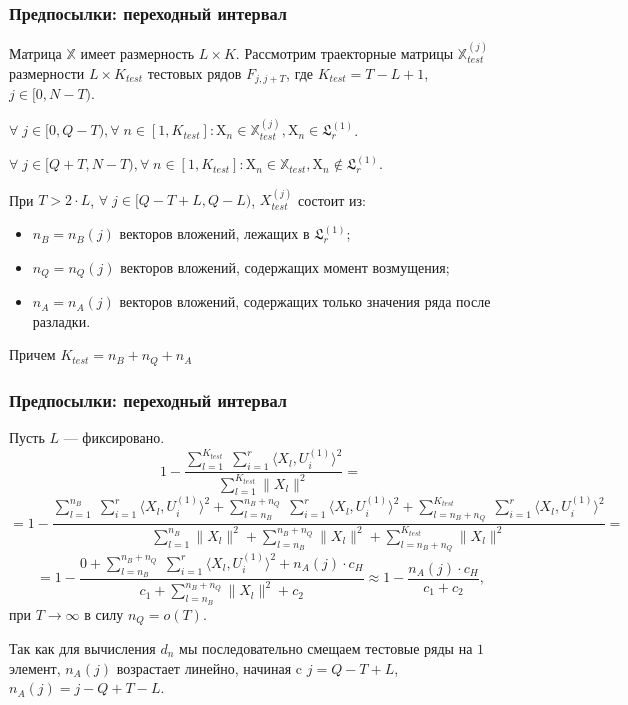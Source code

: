 \documentclass[11pt]{beamer}
\begin{document}
	\begin{frame}
		\frametitle{Предпосылки: переходный интервал}
		Матрица $ \mathbb{X} $ имеет размерность $ L \times K $. Рассмотрим траекторные матрицы $ \mathbb{X}_{test}^{(j)} $ размерности $ L \times K_{test} $ тестовых рядов $ F_{j, j+T} $, где $ K_{test} = T - L + 1 $, $ j \in [0, N-T) $. 
		
		$ \forall \; j \in [0, Q - T), \forall \; n \in [1, K_{test}]: \mathrm{X}_n \in \mathbb{X}_{test}^{(j)},  \mathrm{X}_n \in \mathfrak{L}_r^{(1)}$.
		
		$ \forall \; j \in [Q+T, N-T), \forall \; n \in [1, K_{test}]: \mathrm{X}_n \in \mathbb{X}_{test},  \mathrm{X}_n \notin \mathfrak{L}_r^{(1)} $. 
		
		\bigskip
		
		При $ T > 2 \cdot L $, $ \forall \; j \in [Q - T + L, Q - L)$, $ X_{test}^{(j)} $ состоит из:
		
		\begin{itemize}
			\item $ n_B = n_B(j) $ векторов вложений, лежащих в $ \mathfrak{L}_r^{(1)} $;
			\item $ n_Q = n_Q(j) $ векторов вложений, содержащих момент возмущения;
			\item $ n_A = n_A(j) $ векторов вложений, содержащих только значения ряда после разладки.
		\end{itemize}
		
		Причем $ K_{test} = n_B + n_Q + n_A $
		
	\end{frame}

	\begin{frame}
		\frametitle{Предпосылки: переходный интервал}
		Пусть $ L $ --- фиксировано. 
		\tiny
		$$ 1 - \frac{\sum\limits_{l=1}^{K_{test}}\;\sum\limits_{i=1}^{r}\langle X_l, U_i^{(1)}\rangle^2}{\sum\limits_{l=1}^{K_{test}}\|X_l\|^2} = $$
		$$ = 1 - \frac{\sum\limits_{l=1}^{n_B}\;\sum\limits_{i=1}^{r}\langle X_l, U_i^{(1)}\rangle^2 + \sum\limits_{l=n_B}^{n_B + n_Q}\;\sum\limits_{i=1}^{r}\langle X_l, U_i^{(1)}\rangle^2 + \sum\limits_{l=n_B + n_Q}^{K_{test}}\;\sum\limits_{i=1}^{r}\langle X_l, U_i^{(1)}\rangle^2}{\sum\limits_{l=1}^{n_B}\|X_l\|^2 + \sum\limits_{l=n_B}^{n_B+n_Q}\|X_l\|^2 + \sum\limits_{l=n_B+n_Q}^{K_{test}}\|X_l\|^2} = $$
		$$ = 1 - \frac{0 + \sum\limits_{l=n_B}^{n_B+n_Q}\;\sum\limits_{i=1}^{r}\langle X_l, U_i^{(1)}\rangle^2 + n_A(j) \cdot c_H}{c_1 + \sum\limits_{l=n_B}^{n_B+n_Q}\|X_l\|^2 + c_2} \approx 1 - \frac{n_A(j) \cdot c_H}{c_1 + c_2},$$
		\small
		при $ T \rightarrow \infty $ в силу $ n_Q = o(T) $.
		
		Так как для вычисления $ d_n $ мы последовательно смещаем тестовые ряды на $ 1 $ элемент, $ n_A(j) $ возрастает линейно, начиная c $ j = Q-T+L $, $ n_A(j) = j - Q + T - L $.
		
	\end{frame}
	
\end{document}
